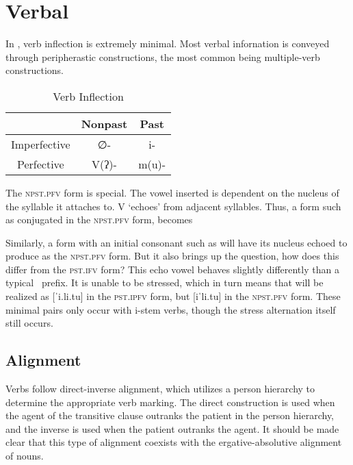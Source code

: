 \chapter{Verbal}


In \langname , verb inflection is extremely minimal. Most verbal infornation is conveyed through peripherastic constructions, the most common being multiple-verb constructions.

\begin{table}[ht]
  \centering
  \begin{tabular}{*{3}{c}}
    \toprule
                 & Nonpast & Past  \\\midrule
    Imperfective & ∅-      & i-    \\
    Perfective   & V(ʔ)-   & m(u)- \\
    \bottomrule
  \end{tabular}
  \caption{Verb Inflection}
  \label{table:verb}
\end{table}

The \textsc{npst.pfv} form is special. The vowel inserted is dependent on the nucleus of the syllable it attaches to. V `echoes' from adjacent syllables. Thus, a form such as  conjugated in the \textsc{npst.pfv} form, becomes 

Similarly, a form with an initial consonant such as  will have its nucleus echoed to produce  as the \textsc{npst.pfv} form. But it also brings up the question, how does this differ from the \textsc{pst.ifv} form? This echo vowel behaves slightly differently than a typical \langname\ prefix. It is unable to be stressed, which in turn means that  will be realized as [ˈi.li.tu] in the \textsc{pst.ipfv} form, but [iˈli.tu] in the \textsc{npst.pfv} form. These minimal pairs only occur with i-stem verbs, though the stress alternation itself still occurs.

\section{Alignment}

Verbs follow direct-inverse alignment, which utilizes a person hierarchy to determine the appropriate verb marking. The direct construction is used when the agent of the transitive clause outranks the patient in the person hierarchy, and the inverse is used when the patient outranks the agent. It should be made clear that this type of alignment coexists with the ergative-absolutive alignment of nouns.

